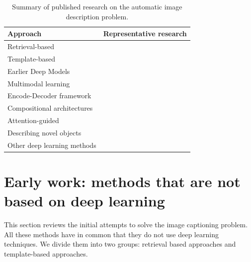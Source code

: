 \begin{table}[ht]
\centering
\caption{Summary of published research on the automatic image description problem.}
\label{tab:overview}
\begin{tabular}[t]{p{} p{}}
    \toprule
    Approach & Representative research\\
    \midrule
    Retrieval-based & \citet{Farhadi2010, Ordonez2011, Gupta2012, Kuznetsova2012, Hodosh2013a, Kuznetsova2014, Mason2015, Hodosh2013b}\\
    Template-based &  \citet{Yang2011, Kulkarni2011, Li2011, Mitchell2012, Ushiku2015}\\
    Earlier Deep Models &  \citet{Socher2014, Karpathy2014, Ma2015, Yan2015, Lebret2015a, Yagcioglu2015}\\
    Multimodal learning & \citet{Kiros2014_VS, Mao2015_mRNN, Karpathy2015, Chen2015}\\
    Encode-Decoder framework & \citet{Kiros2014_LBL, Vinyals2015, Donahue2015, Jia2015, Wu2016, Pu2016_DGDN, Gan2017_Style, Hao2018}\\ 
    Compositional architectures & \citet{Fang2015, Tran2016, Ma2016, Oruganti2016, Wang2016_Parallel, Fu2017, Gan2017_SCN}\\
    Attention-guided & \citet{Xu2015, You2016, Yang2016_RevNet, Zhou2017, Khademi2018, Anderson2018_BUTD, Jiang2018}\\
    Describing novel objects & \citet{Mao2015_Child, Hendricks2016}\\ 
    Other deep learning methods & \citet{Pu2016_VAE, Dai2017_CGAN, Shetty2017, Ren2017, Rennie2017, Zhang2017, Anderson2018_SemiSup, Feng2018, Gu2018, Li2018_CAL, Li2018_VS-LSTM, Lindh2018}\\
    \bottomrule
\end{tabular}
\end{table}


\section{Early work: methods that are not based on deep learning}\label{sec:first-methods}

This section reviews the initial attempts to solve the image captioning problem. All these methods have in common that they do not use deep learning techniques. We divide them into two groups: retrieval based approaches and template-based approaches.


